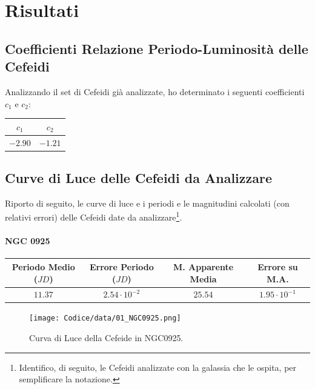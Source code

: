 \documentclass{article}
\newcommand{\e}[1]{\cdot 10^{#1}} %
\begin{document}
  \clearpage
  
\section{Risultati}\label{result}

\subsection{Coefficienti Relazione Periodo-Luminosità delle Cefeidi}

Analizzando il set di Cefeidi già analizzate, ho determinato i
seguenti coefficienti $c_1$ e $c_2$:

\begin{center}
 \begin{tabular}{cc}
  \toprule
  $c_1$ & $c_2$ \\
  \midrule
  $-2.90$ & $-1.21$\\
  \bottomrule
 \end{tabular}
\end{center}

\subsection{Curve di Luce delle Cefeidi da Analizzare}

Riporto di seguito, le curve di luce e i periodi e le magnitudini calcolati (con
relativi errori) delle Cefeidi date da analizzare\footnote{Identifico,
  di seguito, le Cefeidi analizzate con la galassia che le ospita, per
  semplificare la notazione.}.
\paragraph{NGC 0925}
\begin{center}
  \begin{tabular}{cccc}
  \toprule
  Periodo Medio ($JD$) & Errore Periodo ($JD$) & M. Apparente Media &
                                                                  Errore
                                                                      su
                                                                      M.A. \\
  \midrule
  $11.37$ & $2.54\e{-2}$ & $25.54$ & $1.95\e{-1}$ \\
  \bottomrule
 \end{tabular}
\end{center}

\begin{figure}[H]
  \centering
  \texttt{[image: Codice/data/01\_NGC0925.png]}
  \caption{Curva di Luce della Cefeide in NGC0925.}
\end{figure}
\end{document}
